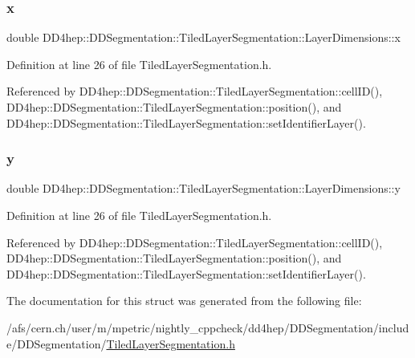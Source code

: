 \subsubsection{\texorpdfstring{x}{x}}
{\footnotesize\ttfamily double D\+D4hep\+::\+D\+D\+Segmentation\+::\+Tiled\+Layer\+Segmentation\+::\+Layer\+Dimensions\+::x}



Definition at line 26 of file Tiled\+Layer\+Segmentation.\+h.



Referenced by D\+D4hep\+::\+D\+D\+Segmentation\+::\+Tiled\+Layer\+Segmentation\+::cell\+I\+D(), D\+D4hep\+::\+D\+D\+Segmentation\+::\+Tiled\+Layer\+Segmentation\+::position(), and D\+D4hep\+::\+D\+D\+Segmentation\+::\+Tiled\+Layer\+Segmentation\+::set\+Identifier\+Layer().

\hypertarget{struct_d_d4hep_1_1_d_d_segmentation_1_1_tiled_layer_segmentation_1_1_layer_dimensions_a11c49c068bf574008a598dd0fbd5df31}{}\label{struct_d_d4hep_1_1_d_d_segmentation_1_1_tiled_layer_segmentation_1_1_layer_dimensions_a11c49c068bf574008a598dd0fbd5df31} 
\subsubsection{\texorpdfstring{y}{y}}
{\footnotesize\ttfamily double D\+D4hep\+::\+D\+D\+Segmentation\+::\+Tiled\+Layer\+Segmentation\+::\+Layer\+Dimensions\+::y}



Definition at line 26 of file Tiled\+Layer\+Segmentation.\+h.



Referenced by D\+D4hep\+::\+D\+D\+Segmentation\+::\+Tiled\+Layer\+Segmentation\+::cell\+I\+D(), D\+D4hep\+::\+D\+D\+Segmentation\+::\+Tiled\+Layer\+Segmentation\+::position(), and D\+D4hep\+::\+D\+D\+Segmentation\+::\+Tiled\+Layer\+Segmentation\+::set\+Identifier\+Layer().



The documentation for this struct was generated from the following file\+:\begin{DoxyCompactItemize}
\item 
/afs/cern.\+ch/user/m/mpetric/nightly\+\_\+cppcheck/dd4hep/\+D\+D\+Segmentation/include/\+D\+D\+Segmentation/\hyperlink{_tiled_layer_segmentation_8h}{Tiled\+Layer\+Segmentation.\+h}\end{DoxyCompactItemize}
